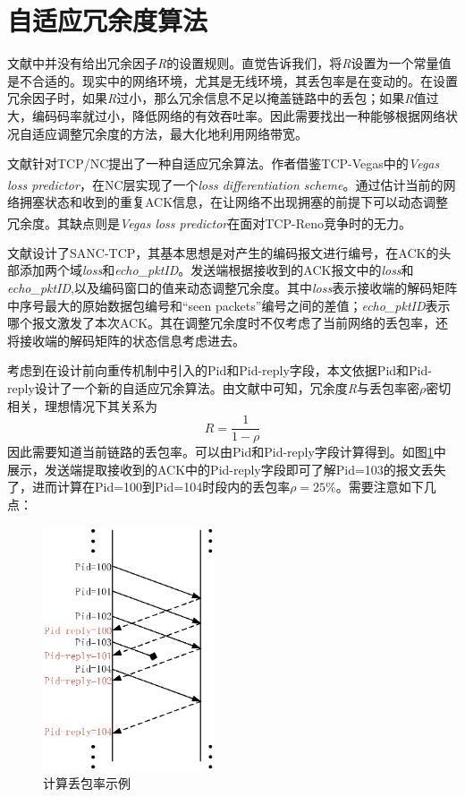 \section{自适应冗余度算法}
文献\cite{Sundararajan2009}中并没有给出冗余因子\emph{R}的设置规则。直觉告诉我们，将\emph{R}设置为一个常量值是不合适的。现实中的网络环境，尤其是无线环境，其丢包率是在变动的。在设置冗余因子时，如果\emph{R}过小，那么冗余信息不足以掩盖链路中的丢包；如果\emph{R}值过大，编码码率就过小，降低网络的有效吞吐率。因此需要找出一种能够根据网络状况自适应调整冗余度的方法，最大化地利用网络带宽。
\par
文献\cite{6261883}针对TCP/NC提出了一种自适应冗余算法。作者借鉴TCP-Vegas中的\emph{Vegas loss predictor}\textsuperscript{\cite{martignon2004loss,brakmo1995tcp}}，在NC层实现了一个\emph{loss differentiation scheme}。通过估计当前的网络拥塞状态和收到的重复ACK信息，在让网络不出现拥塞的前提下可以动态调整冗余度。其缺点则是\emph{Vegas loss predictor}在面对TCP-Reno竞争时的无力\textsuperscript{\cite{hasegawa2000fairness}}。
\par
文献\cite{song2011self}设计了SANC-TCP，其基本思想是对产生的编码报文进行编号，在ACK的头部添加两个域\emph{loss}和\emph{echo\_pktID}。发送端根据接收到的ACK报文中的\emph{loss}和\emph{echo\_pktID},以及编码窗口的值来动态调整冗余度。其中\emph{loss}表示接收端的解码矩阵中序号最大的原始数据包编号和“seen packets”编号之间的差值；\emph{echo\_pktID}表示哪个报文激发了本次ACK。其在调整冗余度时不仅考虑了当前网络的丢包率，还将接收端的解码矩阵的状态信息考虑进去。
\par
考虑到在设计前向重传机制中引入的Pid和Pid-reply字段，本文依据Pid和Pid-reply设计了一个新的自适应冗余算法。由文献\cite{Sundararajan2011}中可知，冗余度\emph{R}与丢包率密$\rho$密切相关，理想情况下其关系为
\begin{equation}
	R=\dfrac{1}{1-\rho}
\end{equation}
因此需要知道当前链路的丢包率。可以由Pid和Pid-reply字段计算得到。如图\ref{DIUBAO_EPS}中展示，发送端提取接收到的ACK中的Pid-reply字段即可了解Pid=103的报文丢失了，进而计算在Pid=100到Pid=104时段内的丢包率$\rho=25\%$。需要注意如下几点：
\begin{figure}[htbp]
	\centering
	\includegraphics[width=2in]{figures/diubao.eps}
	\caption{计算丢包率示例}
	\label{DIUBAO_EPS}
\end{figure}
